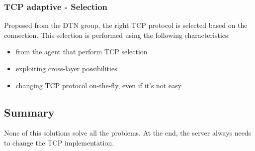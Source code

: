 \subsubsection{TCP adaptive - Selection}
Proposed from the DTN group, the right TCP protocol is selected based on the
connection. This selection is performed using the following characteristics:
\begin{itemize}
\item from the agent that perform TCP selection
\item exploiting cross-layer possibilities
\item changing TCP protocol on-the-fly, even if it's not easy
\end{itemize}

\subsection{Summary}
None of this solutions solve all the problems. At the end, the server always
needs to change the TCP implementation.
